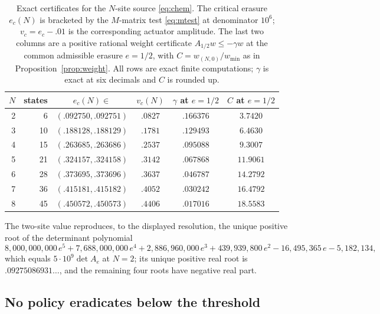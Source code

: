 \begin{table}[t]
\centering
\caption{Exact certificates for the $N$-site source \eqref{eq:chem}. The
critical erasure $e_c(N)$ is bracketed by the $M$-matrix test \eqref{eq:mtest}
at denominator $10^6$; $v_c=e_c-.01$ is the corresponding actuator amplitude.
The last two columns are a positive rational weight certificate
$A_{1/2}w\le-\gamma w$ at the common admissible erasure $e=1/2$, with
$C=w_{(N,0)}/w_{\min}$ as in Proposition~\ref{prop:weight}. All rows are exact
finite computations; $\gamma$ is exact at six decimals and $C$ is rounded up.}
\label{tab:sites}
\begin{tabular}{rrcccc}
\toprule
$N$ & states & $e_c(N)\in$ & $v_c(N)$ & $\gamma$ at $e=1/2$ & $C$ at $e=1/2$\\
\midrule
2 &  6 & $(.092750,.092751)$ & $.0827$ & $.166376$ & $3.7420$\\
3 & 10 & $(.188128,.188129)$ & $.1781$ & $.129493$ & $6.4630$\\
4 & 15 & $(.263685,.263686)$ & $.2537$ & $.095088$ & $9.3007$\\
5 & 21 & $(.324157,.324158)$ & $.3142$ & $.067868$ & $11.9061$\\
6 & 28 & $(.373695,.373696)$ & $.3637$ & $.046787$ & $14.2792$\\
7 & 36 & $(.415181,.415182)$ & $.4052$ & $.030242$ & $16.4792$\\
8 & 45 & $(.450572,.450573)$ & $.4406$ & $.017016$ & $18.5583$\\
\bottomrule
\end{tabular}
\end{table}

The two-site value reproduces, to the displayed resolution, the unique positive
root of the determinant polynomial
\begin{equation}\label{eq:detpoly}
 8{,}000{,}000{,}000\,e^5+7{,}688{,}000{,}000\,e^4+2{,}886{,}960{,}000\,e^3
 +439{,}939{,}800\,e^2-16{,}495{,}365\,e-5{,}182{,}134 ,
\end{equation}
which equals $5\cdot10^{9}\det A_e$ at $N=2$; its unique positive real root is
$.09275086931\ldots$, and the remaining four roots have negative real part.

\subsection{No policy eradicates below the threshold}

